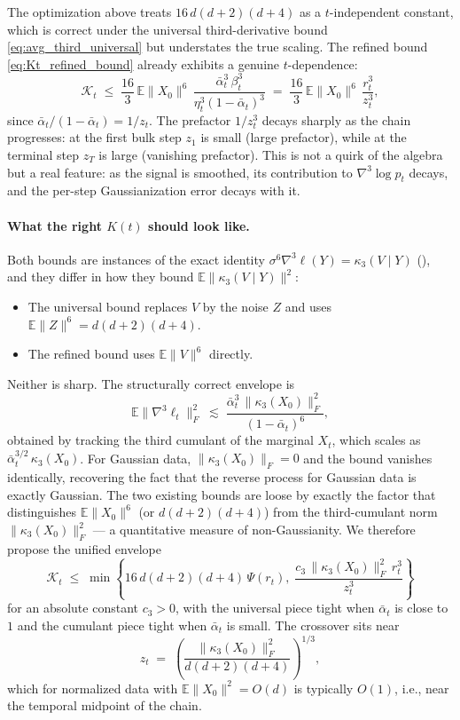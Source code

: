 \documentclass[11pt]{article}
\def\E{\mathbb{E}}
\newcommand{\PsiFn}{\Psi}
\begin{document}
The optimization above treats \(16\,d(d+2)(d+4)\) as a \(t\)-independent constant, which is correct under the universal third-derivative bound \eqref{eq:avg_third_universal} but understates the true scaling. The refined bound \eqref{eq:Kt_refined_bound} already exhibits a genuine \(t\)-dependence:
\begin{equation}
\label{eq:Kt_refined_in_rz}
\mathcal K_t
\;\le\;
\frac{16}{3}\,\E\|X_0\|^6\,\frac{\bar\alpha_t^3\,\beta_t^3}{\eta_t^3(1-\bar\alpha_t)^3}
\;=\;
\frac{16}{3}\,\E\|X_0\|^6\,\frac{r_t^3}{z_t^3},
\end{equation}
since \(\bar\alpha_t/(1-\bar\alpha_t)=1/z_t\). The prefactor \(1/z_t^3\) decays sharply as the chain progresses: at the first bulk step \(z_1\) is small (large prefactor), while at the terminal step \(z_T\) is large (vanishing prefactor). This is not a quirk of the algebra but a real feature: as the signal is smoothed, its contribution to \(\nabla^3\log p_t\) decays, and the per-step Gaussianization error decays with it.

\paragraph{What the right \(K(t)\) should look like.} Both bounds are instances of the exact identity \(\sigma^6\nabla^3\ell(Y)=\kappa_3(V\mid Y)\) (), and they differ in how they bound \(\E\|\kappa_3(V\mid Y)\|^2\):
\begin{itemize}
\item The universal bound replaces \(V\) by the noise \(Z\) and uses \(\E\|Z\|^6=d(d+2)(d+4)\).
\item The refined bound uses \(\E\|V\|^6\) directly.
\end{itemize}
Neither is sharp. The structurally correct envelope is
\begin{equation}
\label{eq:K_cumulant_ideal}
\E\|\nabla^3\ell_t\|_F^2
\;\lesssim\;
\frac{\bar\alpha_t^{3}\,\|\kappa_3(X_0)\|_F^2}{(1-\bar\alpha_t)^{6}},
\end{equation}
obtained by tracking the third cumulant of the marginal \(X_t\), which scales as \(\bar\alpha_t^{3/2}\,\kappa_3(X_0)\). For Gaussian data, \(\|\kappa_3(X_0)\|_F=0\) and the bound vanishes identically, recovering the fact that the reverse process for Gaussian data is exactly Gaussian. The two existing bounds are loose by exactly the factor that distinguishes \(\E\|X_0\|^6\) (or \(d(d+2)(d+4)\)) from the third-cumulant norm \(\|\kappa_3(X_0)\|_F^2\) --- a quantitative measure of non-Gaussianity. We therefore propose the unified envelope
\begin{equation}
\label{eq:K_min_bound}
\mathcal K_t
\;\le\;
\min\!\left\{
16\,d(d+2)(d+4)\,\PsiFn(r_t),\;
\frac{c_3\,\|\kappa_3(X_0)\|_F^2\,r_t^3}{z_t^3}
\right\}
\end{equation}
for an absolute constant \(c_3>0\), with the universal piece tight when \(\bar\alpha_t\) is close to \(1\) and the cumulant piece tight when \(\bar\alpha_t\) is small. The crossover sits near
\[
z_t \;=\; \left(\frac{\|\kappa_3(X_0)\|_F^2}{d(d+2)(d+4)}\right)^{1/3},
\]
which for normalized data with \(\E\|X_0\|^2=O(d)\) is typically \(O(1)\), i.e., near the temporal midpoint of the chain.
\end{document}

